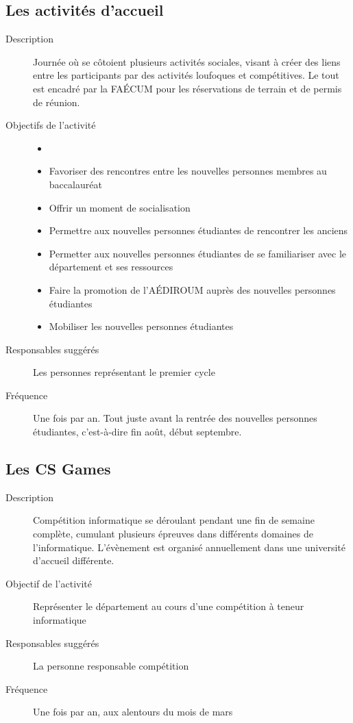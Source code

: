 \documentclass{aediroum}
\begin{document}
\subsection{Les activités d’accueil}\label{sec:activites-accueil}
\begin{description}
	\item[Description] Journée où se côtoient plusieurs activités sociales, visant à créer des liens entre les participants par des activités loufoques et compétitives. Le tout est encadré par la FAÉCUM pour les réservations de terrain et de permis de réunion.
	\item[Objectifs de l'activité]
	\begin{itemize}
		\item[]
		\item Favoriser des rencontres entre les nouvelles personnes membres au baccalauréat
		\item Offrir un moment de socialisation
		\item Permettre aux nouvelles personnes étudiantes de rencontrer les anciens
		\item Permetter aux nouvelles personnes étudiantes de se familiariser avec le département et ses ressources
		\item Faire la promotion de l'AÉDIROUM auprès des nouvelles personnes étudiantes
                \item Mobiliser les nouvelles personnes étudiantes
	\end{itemize}
	\item[Responsables suggérés] Les personnes représentant le premier cycle
	\item[Fréquence] Une fois par an. Tout juste avant la rentrée des nouvelles personnes étudiantes, c'est-à-dire fin août, début septembre.
\end{description}

\subsection{Les CS Games}\label{sec:cs-games}
\begin{description}
	\item[Description] Compétition informatique se déroulant pendant une fin de semaine complète, cumulant plusieurs épreuves dans différents domaines de l'informatique. L'évènement est organisé annuellement dans une université d'accueil différente.
	\item[Objectif de l'activité] Représenter le département au cours d'une compétition à teneur informatique
	\item[Responsables suggérés] La personne responsable compétition
	\item[Fréquence] Une fois par an, aux alentours du mois de mars
\end{description}
\end{document}
